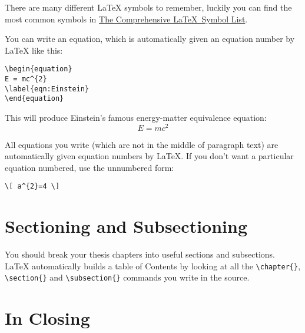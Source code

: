 There are many different \LaTeX{} symbols to remember, luckily you can find the most common symbols in \href{http://ctan.org/pkg/comprehensive}{The Comprehensive \LaTeX~Symbol List}.

You can write an equation, which is automatically given an equation number by \LaTeX{} like this:
\begin{verbatim}
\begin{equation}
E = mc^{2}
\label{eqn:Einstein}
\end{equation}
\end{verbatim}

This will produce Einstein's famous energy-matter equivalence equation:
\begin{equation}
E = mc^{2}
\label{eqn:Einstein}
\end{equation}

All equations you write (which are not in the middle of paragraph text) are automatically given equation numbers by \LaTeX{}. If you don't want a particular equation numbered, use the unnumbered form:
\begin{verbatim}
\[ a^{2}=4 \]
\end{verbatim}


\section{Sectioning and Subsectioning}

You should break your thesis chapters into useful sections and subsections. \LaTeX{} automatically builds a table of Contents by looking at all the \verb|\chapter{}|, \verb|\section{}|  and \verb|\subsection{}| commands you write in the source.


\section{In Closing}

